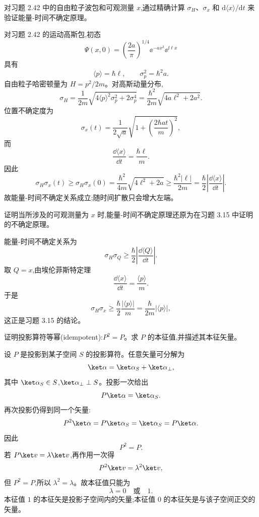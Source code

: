 \begin{question}
对习题 2.42 中的自由粒子波包和可观测量 $x$,通过精确计算 $\sigma_H$、$\sigma_x$ 和 $\mathrm d\langle x\rangle/\mathrm dt$ 来验证能量-时间不确定原理。
\end{question}
\begin{solution}
对习题 2.42 的运动高斯包,初态
\[
\Psi(x,0)=\left(\frac{2a}{\pi}\right)^{1/4}\ee^{-ax^2}\ee^{\ii\ell x}
\]
具有
\[
\langle p\rangle=\hbar\ell,
\qquad
\sigma_p^2=\hbar^2a.
\]
自由粒子哈密顿量为 $H=p^2/2m$。对高斯动量分布,
\[
\sigma_H=\frac1{2m}\sqrt{4\langle p\rangle^2\sigma_p^2+2\sigma_p^4}
=\frac{\hbar^2}{2m}\sqrt{4a\ell^2+2a^2}.
\]
位置不确定度为
\[
\sigma_x(t)=\frac1{2\sqrt a}\sqrt{1+\left(\frac{2\hbar at}{m}\right)^2},
\]
而
\[
\frac{\dd\langle x\rangle}{\dd t}=\frac{\hbar\ell}{m}.
\]
因此
\[
\sigma_H\sigma_x(t)
\ge \sigma_H\sigma_x(0)
=\frac{\hbar^2}{4m}\sqrt{4\ell^2+2a}
\ge \frac{\hbar^2|\ell|}{2m}
=\frac\hbar2\left|\frac{\dd\langle x\rangle}{\dd t}\right|.
\]
故能量-时间不确定关系成立;随时间扩散只会增大左端。
\end{solution}

\begin{question}
证明当所涉及的可观测量为 $x$ 时,能量-时间不确定原理还原为在习题 3.15 中证明的不确定原理。
\end{question}
\begin{solution}
能量-时间不确定关系为
\[
\sigma_H\sigma_Q\ge \frac\hbar2\left|\frac{\dd\langle Q\rangle}{\dd t}\right|.
\]
取 $Q=x$,由埃伦菲斯特定理
\[
\frac{\dd\langle x\rangle}{\dd t}=\frac{\langle p\rangle}{m}.
\]
于是
\[
\sigma_H\sigma_x\ge \frac\hbar2\frac{|\langle p\rangle|}{m}
=\frac{\hbar}{2m}|\langle p\rangle|,
\]
这正是习题 3.15 的结论。
\end{solution}

\begin{question}
证明投影算符等幂(idempotent):$P^2=P$。求 $P$ 的本征值,并描述其本征矢量。
\end{question}
\begin{solution}
设 $P$ 是投影到某子空间 $S$ 的投影算符。任意矢量可分解为
\[
\ket\alpha=\ket\alpha_S+\ket\alpha_\perp,
\]
其中 $\ket\alpha_S\in S$,$\ket\alpha_\perp\perp S$。投影一次给出
\[
P\ket\alpha=\ket\alpha_S.
\]
再次投影仍得到同一个矢量:
\[
P^2\ket\alpha=P\ket\alpha_S=\ket\alpha_S=P\ket\alpha.
\]
因此
\[
\boxed{P^2=P.}
\]
若 $P\ket v=\lambda\ket v$,再作用一次得
\[
P^2\ket v=\lambda^2\ket v,
\]
但 $P^2=P$,所以 $\lambda^2=\lambda$。故本征值只能为
\[
\boxed{\lambda=0\quad\text{或}\quad 1.}
\]
本征值 $1$ 的本征矢是投影子空间内的矢量;本征值 $0$ 的本征矢是与该子空间正交的矢量。
\end{solution}

